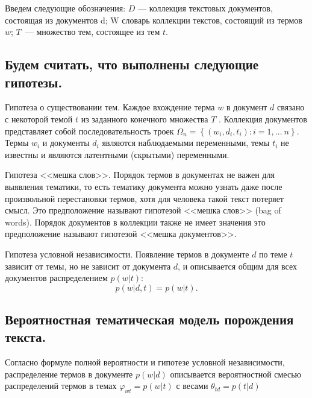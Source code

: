 \documentclass[12pt,twoside]{article}
\begin{document}
	Введем следующие обозначения:  $D$ --- коллекция текстовых документов, состоящая из документов d; W  словарь коллекции текстов, состоящий из термов $w$; $T$~--- множество тем, состоящее из тем  $t$.
	
	\subsection{Будем считать, что выполнены следующие гипотезы.}
	
	Гипотеза о существовании тем. Каждое вхождение терма $w$ в документ $d$ связано
	с некоторой темой $t$ из заданного конечного множества $T$ . Коллекция документов
	представляет собой последовательность троек $\Omega_n = \left\{(w_i, d_i, t_i) : i=1,\dots \ n\right\}$. Термы $w_i$ и документы $d_i$ являются наблюдаемыми переменными, темы $t_i$ не известны
	и являются латентными (скрытыми) переменными.
	
	Гипотеза <<мешка слов>>. Порядок термов в документах не важен для выявления
	тематики, то есть тематику документа можно узнать даже после произвольной перестановки термов, хотя для человека такой текст потеряет смысл. Это предположение
	называют гипотезой <<мешка слов>> (bag of words). Порядок документов в коллекции
	также не имеет значения  это предположение называют гипотезой <<мешка документов>>.
	
	Гипотеза условной независимости. Появление термов в документе $d$ по теме $t$ зависит от темы, но не зависит от документа $d$, и описывается общим для всех документов распределением $p(w|t)$:
	\begin{equation}
	p(w|d, t) = p(w|t).
	\end{equation}
	
	
	\subsection{Вероятностная тематическая модель порождения текста.}
	Согласно формуле полной вероятности и гипотезе условной независимости, распределение термов
	в документе $p(w|d)$ описывается вероятностной смесью распределений термов в темах $\varphi_{wt} = p(w|t)$ с весами $\theta_{td} = p(t|d)$
	
\end{document}
